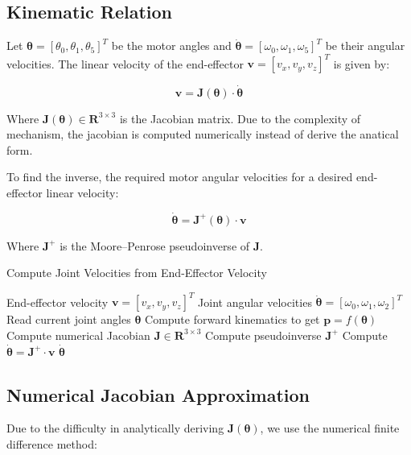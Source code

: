 \documentclass[a4paper,11pt]{article}
\begin{document}
\subsection*{Kinematic Relation}

Let $\boldsymbol{\theta} = [\theta_0, \theta_1, \theta_5]^T$ be the motor angles 
and $\dot{\boldsymbol{\theta}} = [\omega_0, \omega_1, \omega_5]^T$ be their angular velocities. 
The linear velocity of the end-effector $\mathbf{v} = [v_x, v_y, v_z]^T$ is given by:

$$
\mathbf{v} = \mathbf{J}(\boldsymbol{\theta}) \cdot \dot{\boldsymbol{\theta}}
$$

Where $\mathbf{J}(\boldsymbol{\theta}) \in \mathbf{R}^{3 \times 3}$ is the Jacobian matrix. 
Due to the complexity of mechanism, the jacobian is computed numerically instead of derive the anatical form.

To find the inverse, the required motor angular velocities for a desired end-effector linear velocity:

$$
\dot{\boldsymbol{\theta}} = \mathbf{J}^{+}(\boldsymbol{\theta}) \cdot \mathbf{v}
$$

Where $\mathbf{J}^+$ is the Moore–Penrose pseudoinverse of $\mathbf{J}$.

\begin{algorithm}[H]
	\caption{Compute Joint Velocities from End-Effector Velocity}
	\begin{algorithmic}[1]
		\Require End-effector velocity $\mathbf{v} = [v_x, v_y, v_z]^T$
		\Ensure Joint angular velocities $\dot{\boldsymbol{\theta}} = [\omega_0, \omega_1, \omega_2]^T$
		\State Read current joint angles $\boldsymbol{\theta}$
		\State Compute forward kinematics to get $\mathbf{p} = f(\boldsymbol{\theta})$
		\State Compute numerical Jacobian $\mathbf{J} \in \mathbf{R}^{3 \times 3}$
		\State Compute pseudoinverse $\mathbf{J}^{+}$
		\State Compute $\dot{\boldsymbol{\theta}} = \mathbf{J}^{+} \cdot \mathbf{v}$
		\State \Return $\dot{\boldsymbol{\theta}}$
	\end{algorithmic}
\end{algorithm}

\subsection*{Numerical Jacobian Approximation}

Due to the difficulty in analytically deriving $\mathbf{J}(\boldsymbol{\theta})$, we use the numerical finite difference method:
\end{document}
